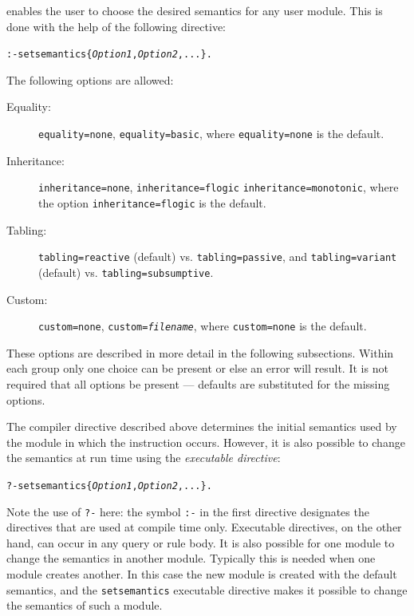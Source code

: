 \documentclass[11pt]{article}
\newcommand{\ERGO}{\mbox{\smaller{\ensuremath{\cal{E}}\smaller{{\sc{RGO}}}}}\xspace}
\newcommand{\FLSYSTEM}{\ERGO}
\begin{document}
\FLSYSTEM enables the user to choose the desired semantics for any user
module. This is done with the help of the following directive:
\begin{alltt}
  :- setsemantics\{\emph{Option1}, \emph{Option2}, ...\}.
\end{alltt}
The following options are allowed:
\begin{description}
  \item[Equality:]  {\tt equality=none}, {\tt equality=basic}, where
  {\tt equality=none} is the default.
\item[Inheritance:] {\tt inheritance=none}, {\tt inheritance=flogic}
  \texttt{inheritance=monotonic},  where the option
  {\tt inheritance=flogic} is the default.
\item[Tabling:] \texttt{tabling=reactive} (default) vs.
  \texttt{tabling=passive}, and \texttt{tabling=variant} (default) vs.
  \texttt{tabling=subsumptive}.
\item[Custom:] {\tt custom=none}, {\tt custom=\emph{filename}}, where
  {\tt custom=none} is the default.
\end{description}
These options are described in more detail in the following
subsections.
Within each group only one choice can be present or else an error will result.
It is not required that all options be present --- defaults are substituted
for the missing options.

The compiler directive described above determines the initial semantics used
by the module in which the instruction occurs. However, it is also possible
to change the semantics at run time using the \emph{executable directive}:
\begin{alltt}
    ?- setsemantics\{\emph{Option1}, \emph{Option2}, ...\}.
\end{alltt}
Note the use of {\tt ?-} here: the symbol {\tt :-} in the first directive
designates the directives that are used at compile time only.  Executable
directives, on the other hand, can occur in any query or rule body.  It is
also possible for one module to change the semantics in another module.
Typically this is needed when one module creates another. In this case the
new module is created with the default semantics, and the {\tt setsemantics}
executable directive makes it possible to change the semantics of such a
module.
\end{document}
